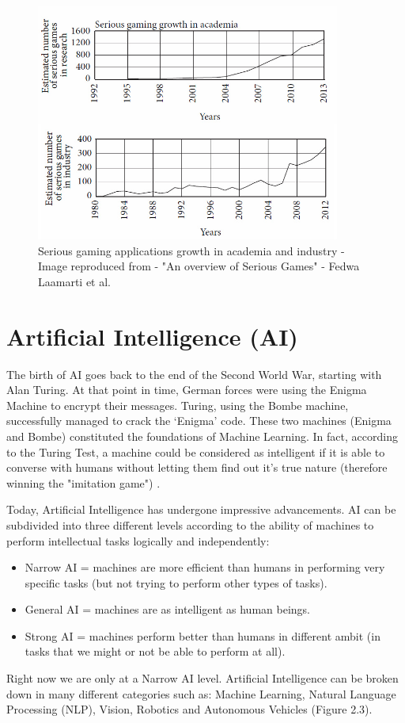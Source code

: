 \begin{figure}[ht!]%
    \centering
    \includegraphics[width=10cm]{images/game.jpg}%
    \caption{Serious gaming applications growth in academia and industry - Image reproduced from \cite{seriouspaper} - "An overview of Serious Games" - Fedwa Laamarti et al.}%
\end{figure}

\section{Artificial Intelligence (AI)}
The birth of AI goes back to the end of the Second World War, starting with Alan Turing. At that point in time, German forces were using the Enigma Machine to encrypt their messages. Turing, using the Bombe machine, successfully managed to crack the ‘Enigma’ code. These two machines (Enigma and Bombe) constituted the foundations of Machine Learning. In fact, according to the Turing Test, a machine could be considered as intelligent if it is able to converse with humans without letting them find out it's true nature (therefore winning the "imitation game") \cite{turing}.

Today, Artificial Intelligence has undergone impressive advancements. AI can be subdivided into three different levels according to the ability of machines to perform intellectual tasks logically and independently:
\begin{itemize}
\itemsep0em
\item Narrow AI = machines are more efficient than humans in performing very specific tasks (but not trying to perform other types of tasks). 
\item General AI = machines are as intelligent as human beings.
\item Strong AI = machines perform better than humans in different ambit (in tasks that we might or not be able to perform at all).
\end{itemize}
Right now we are only at a Narrow AI level. Artificial Intelligence can be broken down in many different categories such as: Machine Learning, Natural Language Processing (NLP), Vision, Robotics and Autonomous Vehicles \cite{AI} (Figure 2.3).

